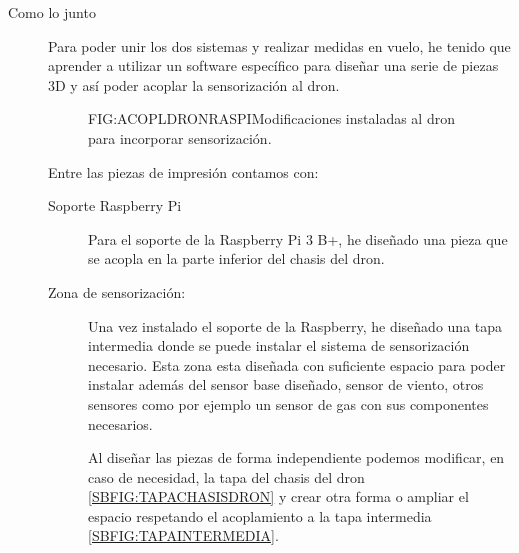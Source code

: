\begin{description}
\item[Como lo junto]
Para poder unir los dos sistemas y realizar medidas en vuelo, he tenido que aprender a utilizar un software específico para diseñar una serie de piezas 3D y así poder acoplar la sensorización al dron.

\begin{figure}[Antes y después de adapatacion raspberry-dron]{FIG:ACOPLDRONRASPI}{Modificaciones instaladas al dron para incorporar sensorización.}
\end{figure}

Entre las piezas de impresión contamos con:
\begin{description}
\item[Soporte Raspberry Pi]
Para el soporte de la Raspberry Pi 3 B+, he diseñado una pieza que se acopla en la parte inferior del chasis del dron. 


\item[Zona de sensorización: ]

Una vez instalado el soporte de la Raspberry, he diseñado una tapa intermedia donde se puede instalar el sistema de sensorización necesario. 
Esta zona esta diseñada con suficiente espacio para poder instalar además del sensor base diseñado, sensor de viento, otros sensores como por ejemplo un sensor de gas con sus componentes necesarios.

%	
%  

Al diseñar las piezas de forma independiente podemos modificar, en caso de necesidad, la tapa del chasis del dron \ref{SBFIG:TAPACHASISDRON} y crear otra forma o ampliar el espacio respetando el acoplamiento a la tapa intermedia  \ref{SBFIG:TAPAINTERMEDIA}.


\end{description}
\end{description}
